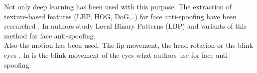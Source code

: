 Not only deep learning has been used with this purpose. The extraction of texture-based features (LBP, HOG, DoG,..) for face anti-spoofing have been researched \cite{distorsion}. In \cite{LBP_FaceAnti} authors study Local Binary Patterns (LBP) and variants of this method for face anti-spoofing.\\

Also the motion has been used. The lip movement, the head rotation or the blink eyes \cite{distorsion}. In \cite{Blink_antispoofing} is the blink movement of the eyes what authors use for face anti-spoofing.\\

